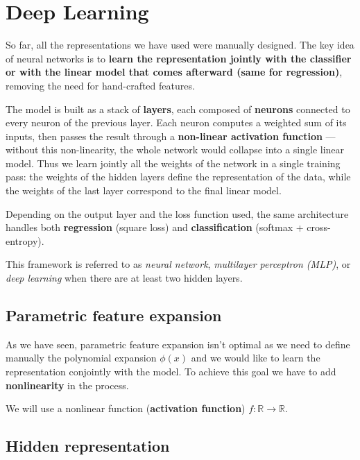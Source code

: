 
\section{Deep Learning}
So far, all the representations we have used were manually designed. 
The key idea of neural networks is to \textbf{learn the representation 
jointly with the classifier or with the linear model that comes afterward (same for regression)}, removing the need for hand-crafted features. 

The model is built as a stack of \textbf{layers}, each composed of 
\textbf{neurons} connected to every neuron of the previous layer. Each 
neuron computes a weighted sum of its inputs, then passes the result 
through a \textbf{non-linear activation function} — without this 
non-linearity, the whole network would collapse into a single linear model. 
Thus we learn jointly all the weights of the network in a single training pass: the weights of the hidden layers define the representation of the data, while the weights of the last layer correspond to the final linear model.

Depending on the output layer and the loss function used, the same 
architecture handles both \textbf{regression} (square loss) and 
\textbf{classification} (softmax + cross-entropy). 

This framework is referred to as \textit{neural network}, \textit{multilayer perceptron (MLP)}, 
or \textit{deep learning} when there are at least two hidden layers.

\subsection{Parametric feature expansion}
As we have seen, parametric feature expansion isn't optimal as we need to define manually the polynomial expansion $\phi(x)$ and we would like to learn the representation conjointly with the model. 
To achieve this goal we have to add \textbf{nonlinearity} in the process. 

We will use a nonlinear function (\textbf{activation function}) $f: \mathbb{R} \to \mathbb{R}$.

\subsection{Hidden representation}

